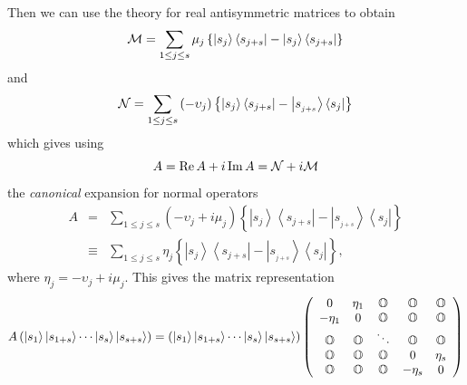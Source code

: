 Then we can use the theory for real antisymmetric matrices to obtain 
\begin{equation}
{\cal M}=\sum_{1\leq j\leq s}\mu _{j}\left\{ \left\vert \stackrel{}{s_{j}}%
\right\rangle \left\langle \stackrel{}{s_{j+s}}\right\vert -\left\vert 
\stackrel{}{s_{j}}\right\rangle \left\langle \stackrel{}{s_{j+s}}\right\vert
\right\}
\end{equation}%
and 
\begin{equation}
{\cal N}=\sum_{1\leq j\leq s}\left( -\upsilon _{j}\right) \left\{ \left\vert 
\stackrel{}{s_{j}}\right\rangle \left\langle \stackrel{}{s_{j+s}}\right\vert
-\left\vert \stackrel{}{s_{_{j+s}}}\right\rangle \left\langle \stackrel{}{%
s_{j}}\right\vert \right\}
\end{equation}%
which gives using 
\begin{equation}
A=%
\mathop{\rm Re}%
A+i%
\mathop{\rm Im}%
A={\cal N}+i{\cal M}
\end{equation}%
the {\em canonical} expansion for normal operators 
\begin{eqnarray}
A &=&\sum_{1\leq j\leq s}\left( -\upsilon _{j}+i\mu _{j}\right) \left\{
\left\vert s_{j}\right\rangle \left\langle s_{j+s}\right\vert -\left\vert
s_{_{j+s}}\right\rangle \left\langle s_{j}\right\vert \right\}  \nonumber \\
&\equiv &\sum_{1\leq j\leq s}\eta _{j}\left\{ \left\vert \stackrel{}{s_{j}}%
\right\rangle \left\langle \stackrel{}{s_{j+s}}\right\vert -\left\vert 
\stackrel{}{s_{_{j+s}}}\right\rangle \left\langle \stackrel{}{s_{j}}%
\right\vert \right\} ,
\end{eqnarray}%
where $\eta _{j}=-\upsilon _{j}+i\mu _{j}$. This gives the matrix
representation 
\begin{equation}
A\left( \left\vert s_{1}\right\rangle \left\vert s_{1+s}\right\rangle \cdots
\left\vert s_{s}\right\rangle \left\vert s_{s+s}\right\rangle \right)
=\left( \left\vert s_{1}\right\rangle \left\vert s_{1+s}\right\rangle \cdots
\left\vert s_{s}\right\rangle \left\vert s_{s+s}\right\rangle \right) \left( 
\begin{array}{ccccc}
0 & \eta _{1} & {\Bbb O} & {\Bbb O} & {\Bbb O} \\ 
-\eta _{1} & 0 & {\Bbb O} & {\Bbb O} & {\Bbb O} \\ 
{\Bbb O} & {\Bbb O} & \ddots & {\Bbb O} & {\Bbb O} \\ 
{\Bbb O} & {\Bbb O} & {\Bbb O} & 0 & \eta _{s} \\ 
{\Bbb O} & {\Bbb O} & {\Bbb O} & -\eta _{s} & 0%
\end{array}%
\right)
\end{equation}%
